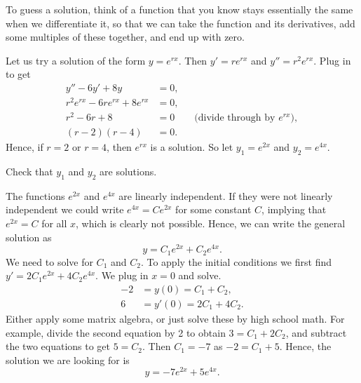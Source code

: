 To guess a solution, think of a function that you know stays essentially the
same when we differentiate it, so that we can take the function and its
derivatives, add some multiples of these together, and end up with zero.

Let us try a solution of the form $y = e^{rx}$.  Then $y' = r e^{rx}$ and
$y'' = r^2 e^{rx}$.  Plug in to get
\begin{align*}
y''-6y'+8y & = 0 , \\
r^2 e^{rx} -6 r e^{rx}+8 e^{rx} & = 0 , \\
r^2 -6 r +8 & = 0 \qquad \text{(divide through by } e^{rx} \text{)},\\
(r-2)(r-4) & = 0 .
\end{align*}
Hence, if $r=2$ or $r=4$, then $e^{rx}$ is a solution.  So let $y_1 = e^{2x}$
and $y_2 = e^{4x}$.

\begin{exercise}
Check that $y_1$ and $y_2$ are solutions.
\end{exercise}

The functions $e^{2x}$ and $e^{4x}$ are linearly independent.  If they
were not linearly independent we could write $e^{4x} = C e^{2x}$ for
some constant $C$,
implying that $e^{2x} = C$ for all $x$, which is clearly not possible. 
Hence, we can write the general solution as
\begin{equation*}
y = C_1 e^{2x} + C_2 e^{4x} .
\end{equation*}
We need to solve for $C_1$ and $C_2$.  To apply the initial conditions
we first find $y' = 2 C_1 e^{2x} + 4 C_2 e^{4x}$.  We plug in $x=0$ and
solve.
\begin{align*}
-2 & = y(0) = C_1 + C_2 , \\
6 & = y'(0) = 2 C_1 + 4 C_2 .
\end{align*}
Either apply some matrix algebra, or just solve these by high school
math.  For example, divide the second equation by 2
to obtain $3 = C_1 + 2 C_2$, and subtract the two equations to
get $5 = C_2$.  Then $C_1 = -7$ as $-2 = C_1 + 5$.  Hence, the solution we
are
looking for is
\begin{equation*}
y = -7 e^{2x} + 5 e^{4x} .
\end{equation*}

\medskip

